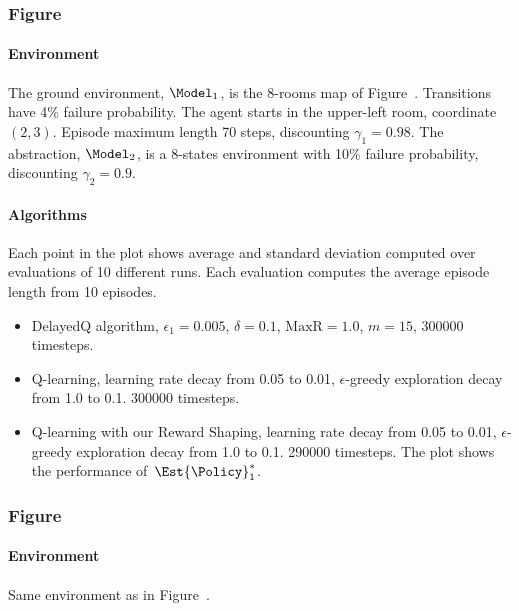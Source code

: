 \subsubsection*{Figure~}
\paragraph{Environment}
The ground environment, $\Model_1$, is the 8-rooms map of Figure~.
Transitions have 4\% failure probability.
The agent starts in the upper-left room, coordinate $(2, 3)$.
Episode maximum length 70 steps, discounting $\gamma_1 = 0.98$.
The abstraction, $\Model_2$, is a 8-states environment with 10\% failure probability, discounting $\gamma_2 = 0.9$.

\paragraph{Algorithms}
Each point in the plot shows average and standard deviation computed over evaluations of 10 different runs.
Each evaluation computes the average episode length from 10 episodes.
\begin{itemize}
	\item DelayedQ algorithm,
		$\epsilon_1 = 0.005$, $\delta = 0.1$, $\text{MaxR} = 1.0$, $m = 15$,
		300000 timesteps.
	\item Q-learning,
		learning rate decay from 0.05 to 0.01, 
		$\epsilon$-greedy exploration decay from 1.0 to 0.1.
		300000 timesteps.
	\item Q-learning with our Reward Shaping,
		learning rate decay from 0.05 to 0.01,
		$\epsilon$-greedy exploration decay from 1.0 to 0.1.
		290000 timesteps.
		The plot shows the performance of~$\Est{\Policy}_1^*$.
\end{itemize}


\subsubsection*{Figure~}
\paragraph{Environment}
Same environment as in Figure~.

